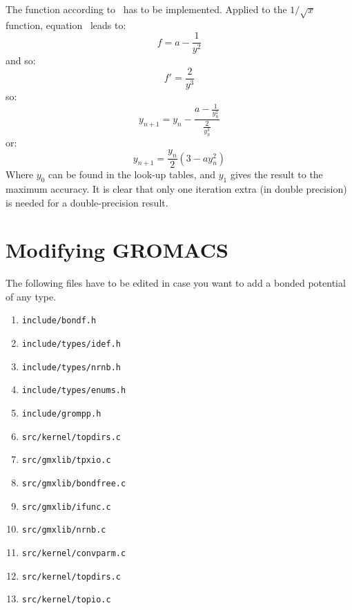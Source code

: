The function according to~ has to be implemented. 
Applied to the $1/\sqrt{x}$ function, equation~ leads to:
\begin{equation}
f = a - \frac{1}{y^{2}}
\end{equation}
and so:
\begin{equation}
f' = \frac{2}{y^{3}}
\end{equation}
so:
\begin{equation}
y_{n+1} = y_{n} - \frac{ a - \frac{1}{y^{2}_{n}} }{ \frac{2}{y^{3}_{n}} }
\end{equation}
or:
\begin{equation}
y_{n+1} = \frac{y_{n}}{2} (3 - a y^{2}_{n})
\end{equation}
Where $y_{0}$ can be found in the look-up tables, and $y_{1}$ gives the result
to the maximum accuracy. 
It is clear that only one iteration extra (in double 
precision) is needed for a double-precision result.

\section{Modifying GROMACS}
The following files have to be edited in case you want to add a bonded
potential of any type.
\begin{enumerate}
\item {\tt include/bondf.h}
\item {\tt include/types/idef.h}
\item {\tt include/types/nrnb.h}
\item {\tt include/types/enums.h}
\item {\tt include/grompp.h}
\item {\tt src/kernel/topdirs.c}
\item {\tt src/gmxlib/tpxio.c}
\item {\tt src/gmxlib/bondfree.c}
\item {\tt src/gmxlib/ifunc.c}
\item {\tt src/gmxlib/nrnb.c}
\item {\tt src/kernel/convparm.c}
\item {\tt src/kernel/topdirs.c}
\item {\tt src/kernel/topio.c}
\end{enumerate}

